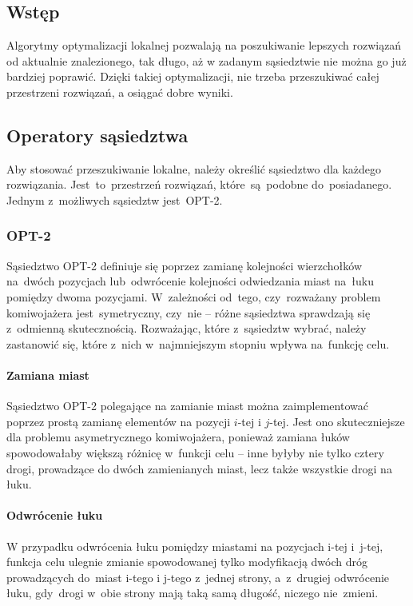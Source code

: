 \subsection{Wstęp}

Algorytmy optymalizacji lokalnej pozwalają na poszukiwanie lepszych rozwiązań od aktualnie znalezionego, tak długo, aż w zadanym sąsiedztwie nie można go już bardziej poprawić. Dzięki takiej optymalizacji, nie trzeba przeszukiwać całej przestrzeni rozwiązań, a osiągać dobre wyniki. 

\subsection{Operatory sąsiedztwa}

Aby stosować przeszukiwanie lokalne, należy określić sąsiedztwo dla każdego rozwiązania. Jest~to~przestrzeń rozwiązań, które~są~podobne do~posiadanego. Jednym z~możliwych sąsiedztw jest~OPT-2.

\subsubsection{OPT-2}

Sąsiedztwo OPT-2 definiuje się poprzez zamianę kolejności wierzchołków na~dwóch pozycjach lub~odwrócenie kolejności odwiedzania miast na~łuku pomiędzy dwoma pozycjami. W~zależności od~tego, czy~rozważany problem komiwojażera jest~symetryczny, czy~nie -- różne sąsiedztwa sprawdzają się z~odmienną skutecznością. Rozważając, które z~sąsiedztw wybrać, należy zastanowić się, które z~nich w~najmniejszym stopniu wpływa na~funkcję celu.

\paragraph{Zamiana miast}

Sąsiedztwo OPT-2 polegające na zamianie miast można zaimplementować poprzez prostą zamianę elementów na pozycji $i$-tej i $j$-tej. Jest ono skuteczniejsze dla problemu asymetrycznego komiwojażera, ponieważ zamiana łuków spowodowałaby większą różnicę w~funkcji celu -- inne byłyby nie tylko cztery drogi, prowadzące do dwóch zamienianych miast, lecz także wszystkie drogi na łuku.

\paragraph{Odwrócenie łuku}

W przypadku odwrócenia łuku pomiędzy miastami na pozycjach i-tej i~j-tej, funkcja celu ulegnie zmianie spowodowanej tylko modyfikacją dwóch dróg prowadzących do~miast i-tego i j-tego z~jednej strony, a~z~drugiej odwrócenie łuku, gdy~drogi w~obie strony mają taką samą długość, niczego nie~zmieni.

